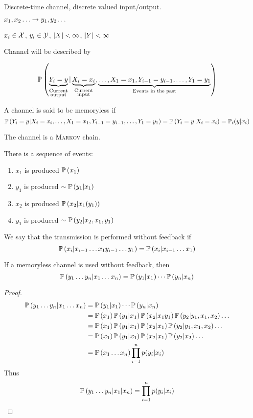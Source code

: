 Discrete-time channel, discrete valued input/output.

$x_1,x_2\ldots \rightarrow y_1, y_2\ldots$

$x_i \in \mathcal{X}$, $y_i \in \mathcal{Y}$, $\left\lvert X\right\rvert < \infty$, $\left\lvert Y\right\rvert < \infty$

Channel will be described by 

\[
    \mathbb{P}\left( \underbrace{Y_i = y}_{\substack{\text{Current}\\\text{output}}} | \underbrace{X_i=x_i}_{\substack{\text{Current}\\\text{input}}}, \underbrace{\ldots, X_1 = x_1,Y_{i-1}=y_{i-1},\ldots, Y_1=y_1}_{\text{Events in the past}} \right)
\]

A channel is said to be memoryless if
\[
    \mathbb{P}\left( Y_i = y | X_i=x_i, \ldots, X_1 = x_1,Y_{i-1}=y_{i-1},\ldots, Y_1=y_1 \right) = \mathbb{P}\left( Y_i = y | X_i=x_i \right) = \mathbb{P}_i(y\vert x_i)
\]

The channel is a \textsc{Markov} chain.

There is a sequence of events:
\begin{enumerate}
    \item $x_1$ is produced $\mathbb{P}\left( x_1 \right)$
    \item $y_1$ is produced $\sim \mathbb{P}\left( y_1 \vert x_1 \right)$
    \item $x_2$ is produced $\mathbb{P}\left( x_2\vert x_1 (y_1) \right)$
    \item $y_1$ is produced $\sim \mathbb{P}\left( y_2 \vert x_2, x_1, y_1 \right)$
\end{enumerate}

We say that the transmission is performed without feedback if
\[
    \mathbb{P}\left( x_i \vert x_{i-1} \ldots x_1 y_{i-1}\ldots y_1 \right) = \mathbb{P}\left( x_i \vert x_{i-1}\ldots x_1 \right)
\]

\begin{theorem}
    If a memoryless channel is used without feedback, then
    \[
        \mathbb{P}\left( y_1\ldots y_n\vert x_1\ldots x_n \right) = \mathbb{P}\left( y_1 \vert x_1 \right) \cdots \mathbb{P}\left( y_n \vert x_n \right)
    \]
\end{theorem}
\begin{proof}
    \[
        \begin{aligned}
            \mathbb{P}\left( y_1\ldots y_n\vert x_1\ldots x_n \right) &= \mathbb{P}\left( y_1 \vert x_1 \right) \cdots \mathbb{P}\left( y_n \vert x_n \right)\\
            &= \mathbb{P}\left( x_1 \right) \mathbb{P}\left( y_1\vert x_1 \right) \mathbb{P}\left( x_2\vert x_1 y_1 \right)\mathbb{P}\left( y_2\vert y_1, x_1, x_2 \right) \ldots\\
            &= \mathbb{P}\left( x_1 \right) \mathbb{P}\left( y_1\vert x_1 \right) \mathbb{P}\left( x_2\vert x_1 \right)\mathbb{P}\left( y_2\vert y_1, x_1, x_2 \right) \ldots\\
            &= \mathbb{P}\left( x_1 \right) \mathbb{P}\left( y_1\vert x_1 \right) \mathbb{P}\left( x_2\vert x_1 \right)\mathbb{P}\left( y_2\vert x_2 \right) \ldots\\
            &= \mathbb{P}\left( x_1\ldots x_n \right) \prod\limits_{i=1}^n p(y_i \vert x_i)
        \end{aligned}
    \]
    Thus
    \[
        \mathbb{P}\left( y_1\ldots y_n \vert x_1\vert x_n \right) = \prod\limits_{i=1}^n p(y_i \vert x_i)
    \]
\end{proof}

